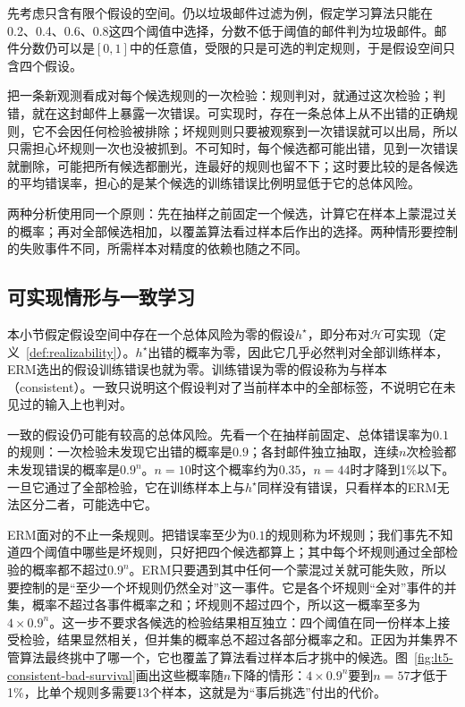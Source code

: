 先考虑只含有限个假设的空间。仍以垃圾邮件过滤为例，假定学习算法只能在0.2、0.4、0.6、0.8这四个阈值中选择，分数不低于阈值的邮件判为垃圾邮件。邮件分数仍可以是$[0,1]$中的任意值，受限的只是可选的判定规则，于是假设空间只含四个假设。

把一条新观测看成对每个候选规则的一次检验：规则判对，就通过这次检验；判错，就在这封邮件上暴露一次错误。可实现时，存在一条总体上从不出错的正确规则，它不会因任何检验被排除；坏规则则只要被观察到一次错误就可以出局，所以只需担心坏规则一次也没被抓到。不可知时，每个候选都可能出错，见到一次错误就删除，可能把所有候选都删光，连最好的规则也留不下；这时要比较的是各候选的平均错误率，担心的是某个候选的训练错误比例明显低于它的总体风险。

两种分析使用同一个原则：先在抽样之前固定一个候选，计算它在样本上蒙混过关的概率；再对全部候选相加，以覆盖算法看过样本后作出的选择。两种情形要控制的失败事件不同，所需样本对精度的依赖也随之不同。

\subsection{可实现情形与一致学习}

本小节假定假设空间中存在一个总体风险为零的假设$h^\star$，即分布对$\mathcal H$可实现（定义~\ref{def:realizability}）。$h^\star$出错的概率为零，因此它几乎必然判对全部训练样本，ERM选出的假设训练错误也就为零。训练错误为零的假设称为与样本（consistent）。一致只说明这个假设判对了当前样本中的全部标签，不说明它在未见过的输入上也判对。

一致的假设仍可能有较高的总体风险。先看一个在抽样前固定、总体错误率为$0.1$的规则：一次检验未发现它出错的概率是$0.9$；各封邮件独立抽取，连续$n$次检验都未发现错误的概率是$0.9^n$。$n=10$时这个概率约为$0.35$，$n=44$时才降到1\%以下。一旦它通过了全部检验，它在训练样本上与$h^\star$同样没有错误，只看样本的ERM无法区分二者，可能选中它。

ERM面对的不止一条规则。把错误率至少为$0.1$的规则称为坏规则；我们事先不知道四个阈值中哪些是坏规则，只好把四个候选都算上；其中每个坏规则通过全部检验的概率都不超过$0.9^n$。ERM只要遇到其中任何一个蒙混过关就可能失败，所以要控制的是“至少一个坏规则仍然全对”这一事件。它是各个坏规则“全对”事件的并集，概率不超过各事件概率之和；坏规则不超过四个，所以这一概率至多为$4\times0.9^n$。这一步不要求各候选的检验结果相互独立：四个阈值在同一份样本上接受检验，结果显然相关，但并集的概率总不超过各部分概率之和。正因为并集界不管算法最终挑中了哪一个，它也覆盖了算法看过样本后才挑中的候选。图~\ref{fig:lt5-consistent-bad-survival}画出这些概率随$n$下降的情形：$4\times0.9^n$要到$n=57$才低于1\%，比单个规则多需要13个样本，这就是为“事后挑选”付出的代价。

